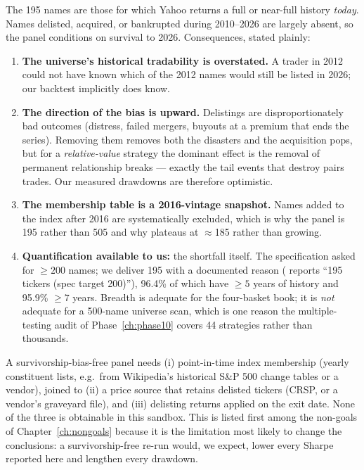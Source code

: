 The 195 names are those for which Yahoo returns a full or near-full history \emph{today}.
Names delisted, acquired, or bankrupted during 2010--2026 are largely absent, so the panel
conditions on survival to 2026. Consequences, stated plainly:

\begin{enumerate}
  \item \textbf{The universe's historical tradability is overstated.} A trader in 2012
    could not have known which of the 2012 names would still be listed in 2026; our
    backtest implicitly does know.
  \item \textbf{The direction of the bias is upward.} Delistings are disproportionately
    bad outcomes (distress, failed mergers, buyouts at a premium that ends the series).
    Removing them removes both the disasters and the acquisition pops, but for a
    \emph{relative-value} strategy the dominant effect is the removal of permanent
    relationship breaks --- exactly the tail events that destroy pairs trades. Our
    measured drawdowns are therefore optimistic.
  \item \textbf{The membership table is a 2016-vintage snapshot.} Names added to the index
    after 2016 are systematically excluded, which is why the panel is 195 rather than 505
    and why  plateaus at $\approx$185 rather than growing.
  \item \textbf{Quantification available to us:} the shortfall itself. The specification
    asked for $\ge200$ names; we deliver 195 with a documented reason
    ( reports ``195 tickers (spec target 200)''), 96.4\% of which have
    $\ge5$ years of history and 95.9\% $\ge7$ years. Breadth is adequate for the
    four-basket book; it is \emph{not} adequate for a 500-name universe scan, which is
    one reason the multiple-testing audit of Phase~\ref{ch:phase10} covers 44 strategies
    rather than thousands.
\end{enumerate}

\begin{remark}
A survivorship-bias-free panel needs (i) point-in-time index membership (yearly constituent
lists, e.g.\ from Wikipedia's historical S\&P 500 change tables or a vendor), joined to
(ii) a price source that retains delisted tickers (CRSP, or a vendor's graveyard file),
and (iii) delisting returns applied on the exit date. None of the three is obtainable in
this sandbox. This is listed first among the non-goals of Chapter~\ref{ch:nongoals}
because it is the limitation most likely to change the conclusions: a survivorship-free
re-run would, we expect, lower every Sharpe reported here and lengthen every drawdown.
\end{remark}


